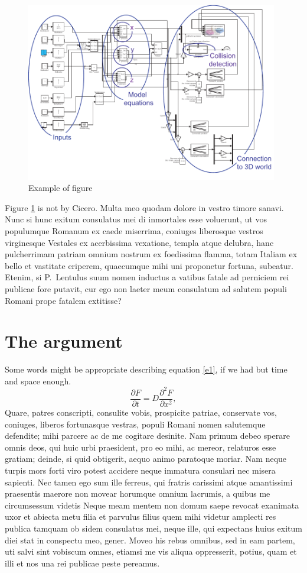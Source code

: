 \documentclass[a4paper,12pt,twoside,swedish]{report}
\begin{document}
\begin{figure}
\begin{center}
    \includegraphics[width=11cm]{Figures/block_simulink.pdf} 
\end{center}
\caption{Example of figure}
\label{model_block}
\end{figure}

Figure \ref{model_block} is not by Cicero.
Multa meo quodam dolore in vestro timore sanavi. Nunc si hunc exitum
consulatus mei di inmortales esse voluerunt, ut vos populumque Romanum
ex caede miserrima, coniuges liberosque vestros virginesque Vestales ex
acerbissima vexatione, templa atque delubra, hanc pulcherrimam patriam
omnium nostrum ex foedissima flamma, totam Italiam ex bello et vastitate
eriperem, quaecumque mihi uni proponetur fortuna, subeatur. Etenim, si
P.~Lentulus suum nomen inductus a vatibus fatale ad perniciem rei
publicae fore putavit, cur ego non laeter meum consulatum ad salutem
populi Romani prope fatalem extitisse?


\section{The argument}
Some words might be appropriate describing equation \ref{e1}, if we
had but time and space enough.
\begin{equation}
\frac{\partial F}{\partial
t}=D\frac{\partial^2 F}{\partial x^2},
\label{e1}
\end{equation}
Quare, patres conscripti, consulite vobis, prospicite patriae,
conservate vos, coniuges, liberos fortunasque vestras, populi Romani
nomen salutemque defendite; mihi parcere ac de me cogitare desinite. Nam
primum debeo sperare omnis deos, qui huic urbi praesident, pro eo mihi,
ac mereor, relaturos esse gratiam; deinde, si quid obtigerit, aequo
animo paratoque moriar. Nam neque turpis mors forti viro potest accidere
neque immatura consulari nec misera sapienti. Nec tamen ego sum ille
ferreus, qui fratris carissimi atque amantissimi praesentis maerore non
movear horumque omnium lacrumis, a quibus me circumsessum videtis Neque
meam mentem non domum saepe revocat exanimata uxor et abiecta metu filia
et parvulus filius quem mihi videtur amplecti res publica tamquam ob
sidem consulatus mei, neque ille, qui expectans huius exitum diei stat
in conspectu meo, gener. Moveo his rebus omnibus, sed in eam partem, uti
salvi sint vobiscum omnes, etiamsi me vis aliqua oppresserit, potius,
quam et illi et nos una rei publicae peste pereamus.
\end{document}

